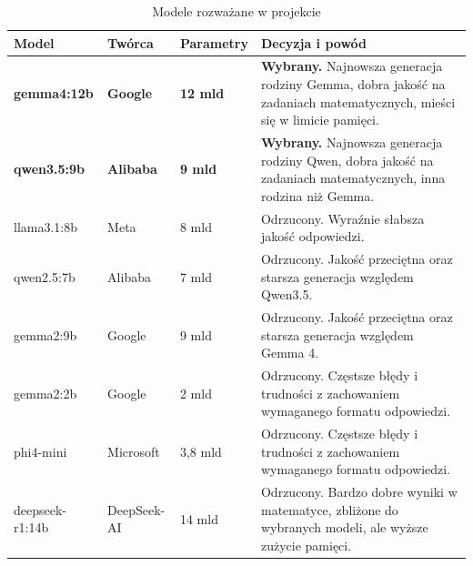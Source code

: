 \begin{table}[H]
    \centering
    \caption{Modele rozważane w projekcie}
    \label{tab:kandydaci_modeli}

    \small
    \setlength{\tabcolsep}{7pt}
    \renewcommand{\arraystretch}{1.35}
    \begin{tabular}{|p{3.8cm}|p{2.3cm}|p{2.3cm}|>{\raggedright\arraybackslash}p{5.3cm}|}
        \hline
        \rowcolor{gray!20}
        \textbf{Model} & \textbf{Twórca} & \textbf{Parametry} & \textbf{Decyzja i powód} \\ \hline
        \textbf{gemma4:12b} &
        \textbf{Google} &
        \textbf{12 mld} &
        \textbf{Wybrany.} Najnowsza generacja rodziny Gemma, dobra jakość na zadaniach matematycznych, mieści się w limicie pamięci. \\ \hline
        \textbf{qwen3.5:9b} &
        \textbf{Alibaba} &
        \textbf{9 mld} &
        \textbf{Wybrany.} Najnowsza generacja rodziny Qwen, dobra jakość na zadaniach matematycznych, inna rodzina niż Gemma. \\ \hline
        llama3.1:8b &
        Meta &
        8 mld &
        Odrzucony. Wyraźnie słabsza jakość odpowiedzi. \\ \hline
        qwen2.5:7b &
        Alibaba &
        7 mld &
        Odrzucony. Jakość przeciętna oraz starsza generacja względem Qwen3.5. \\ \hline
        gemma2:9b &
        Google &
        9 mld &
        Odrzucony. Jakość przeciętna oraz starsza generacja względem Gemma 4. \\ \hline
        gemma2:2b &
        Google &
        2 mld &
        Odrzucony. Częstsze błędy i trudności z zachowaniem wymaganego formatu odpowiedzi. \\ \hline
        phi4-mini &
        Microsoft &
        3,8 mld &
        Odrzucony. Częstsze błędy i trudności z zachowaniem wymaganego formatu odpowiedzi. \\ \hline
        deepseek-r1:14b &
        DeepSeek-AI &
        14 mld &
        Odrzucony. Bardzo dobre wyniki w matematyce, zbliżone do wybranych modeli, ale wyższe zużycie pamięci. \\ \hline
    \end{tabular}
\end{table}
